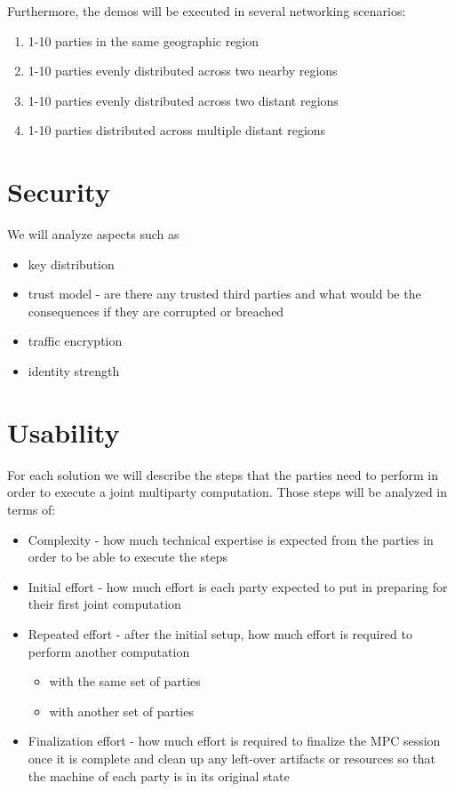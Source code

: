 Furthermore, the demos will be executed in several networking scenarios:

\begin{enumerate}
\def\labelenumi{\arabic{enumi}.}
\tightlist
\item
  1-10 parties in the same geographic region
\item
  1-10 parties evenly distributed across two nearby regions
\item
  1-10 parties evenly distributed across two distant regions
\item
  1-10 parties distributed across multiple distant regions
\end{enumerate}

\hypertarget{thesis__030-methods.md__security}{%
\section{Security}\label{thesis__030-methods.md__security}}

We will analyze aspects such as

\begin{itemize}
\tightlist
\item
  key distribution
\item
  trust model - are there any trusted third parties and what would be
  the consequences if they are corrupted or breached
\item
  traffic encryption
\item
  identity strength
\end{itemize}

\hypertarget{thesis__030-methods.md__usability}{%
\section{Usability}\label{thesis__030-methods.md__usability}}

For each solution we will describe the steps that the parties need to
perform in order to execute a joint multiparty computation. Those steps
will be analyzed in terms of:

\begin{itemize}
\tightlist
\item
  Complexity - how much technical expertise is expected from the parties
  in order to be able to execute the steps
\item
  Initial effort - how much effort is each party expected to put in
  preparing for their first joint computation
\item
  Repeated effort - after the initial setup, how much effort is required
  to perform another computation

  \begin{itemize}
  \tightlist
  \item
    with the same set of parties
  \item
    with another set of parties
  \end{itemize}
\item
  Finalization effort - how much effort is required to finalize the MPC
  session once it is complete and clean up any left-over artifacts or
  resources so that the machine of each party is in its original state
\end{itemize}


